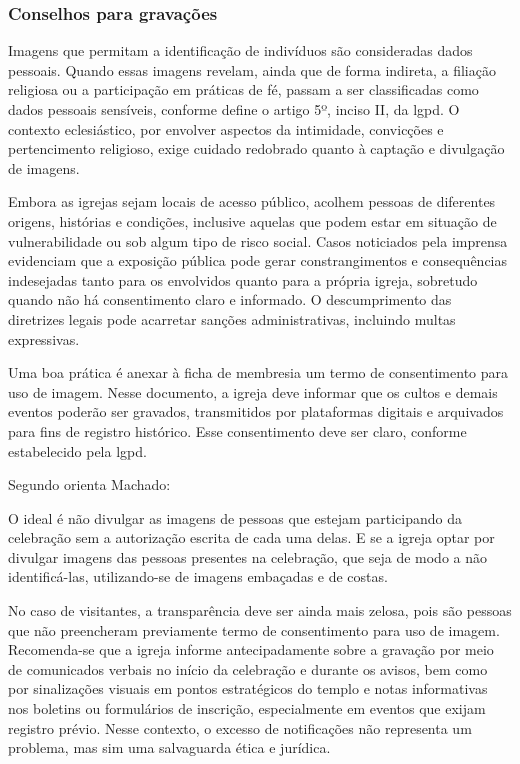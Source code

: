 \subsubsection{Conselhos para gravações}


Imagens que permitam a identificação de indivíduos são consideradas dados pessoais. Quando essas imagens revelam, ainda que de forma indireta, a filiação religiosa ou a participação em práticas de fé, passam a ser classificadas como dados pessoais sensíveis, conforme define o artigo 5º, inciso II, da \gls{lgpd}. O contexto eclesiástico, por envolver aspectos da intimidade, convicções e pertencimento religioso, exige cuidado redobrado quanto à captação e divulgação de imagens.

Embora as igrejas sejam locais de acesso público, acolhem pessoas de diferentes origens, histórias e condições, inclusive aquelas que podem estar em situação de vulnerabilidade ou sob algum tipo de risco social. Casos noticiados pela imprensa evidenciam que a exposição pública pode gerar constrangimentos e consequências indesejadas tanto para os envolvidos quanto para a própria igreja, sobretudo quando não há consentimento claro e informado\cite{silva2023}. O descumprimento das diretrizes legais pode acarretar sanções administrativas, incluindo multas expressivas.

Uma boa prática é anexar à ficha de membresia um termo de consentimento para uso de imagem. Nesse documento, a igreja deve informar que os cultos e demais eventos poderão ser gravados, transmitidos por plataformas digitais e arquivados para fins de registro histórico. Esse consentimento deve ser claro, conforme estabelecido pela \gls{lgpd}.

Segundo orienta Machado:

\begin{citacao}
O ideal é não divulgar as imagens de pessoas que estejam participando da celebração sem a autorização escrita de cada uma delas. E se a igreja optar por divulgar imagens das pessoas presentes na celebração, que seja de modo a não identificá-las, utilizando-se de imagens embaçadas e de costas.\cite[p.~12]{machado2020}
\end{citacao}

No caso de visitantes, a transparência deve ser ainda mais zelosa, pois são pessoas que não preencheram previamente termo de consentimento para uso de imagem. Recomenda-se que a igreja informe antecipadamente sobre a gravação por meio de comunicados verbais no início da celebração e durante os avisos, bem como por sinalizações visuais em pontos estratégicos do templo e notas informativas nos boletins ou formulários de inscrição, especialmente em eventos que exijam registro prévio. Nesse contexto, o excesso de notificações não representa um problema, mas sim uma salvaguarda ética e jurídica.

